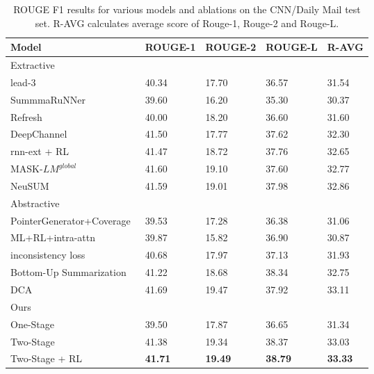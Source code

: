 \documentclass{article}
\begin{document}
\begin{table*}[tpb]  
\centering
\begin{tabular}{l|lll|l}
\hline
Model                 & ROUGE-1                     & ROUGE-2       &      ROUGE-L    &  R-AVG     \\ \hline
Extractive \\ \hline
lead-3~\cite{See2017}   & 40.34    &  17.70   &      36.57     &   31.54        \\
SummmaRuNNer~\cite{NallapatiZZ17}     & 39.60     &  16.20         &      35.30     &   30.37         \\ 
Refresh~\cite{Narayan2018}               & 40.00                       &  18.20         &      36.60     & 31.60            \\ 
DeepChannel~\cite{Shi2018}  & 41.50                       &  17.77         &      37.62   & 32.30        \\
rnn-ext + RL~\cite{chen2018fast}          & 41.47                       &  18.72         &      37.76   & 32.65            \\
MASK-$LM^{global}$~\cite{Chang2019}   & 41.60 & 19.10 & 37.60 & 32.77 \\
NeuSUM~\cite{DBLP:conf/acl/ZhaoZWYHZ18}              & 41.59                       &  19.01         &      37.98     & 32.86          \\
\hline
Abstractive \\ \hline
PointerGenerator+Coverage~\cite{See2017}      & 39.53                       & 17.28         &      36.38      & 31.06           \\
ML+RL+intra-attn~\cite{Paulus2018} & 39.87                  &  15.82        &      36.90      & 30.87           \\ 
inconsistency loss\cite{hsu2018unified}    & 40.68                       &  17.97        &      37.13      & 31.93      \\
Bottom-Up Summarization~\cite{gehrmann2018bottom} & 41.22                     &  18.68        &      38.34      & 32.75      \\
DCA~\cite{Celikyilmaz2018}                   & 41.69                       &  19.47        &      37.92      & 33.11         \\ \hline
Ours \\ \hline
One-Stage           &39.50        & 17.87          & 36.65  & 31.34  \\   
Two-Stage         & 41.38  & 19.34 & 38.37       & 33.03 \\
Two-Stage + RL               & \textbf{41.71} & \textbf{19.49} & \textbf{38.79}               & \textbf{33.33}                      \\ \hline
\end{tabular}
\caption{ROUGE F1 results for various models and ablations on the CNN/Daily Mail test set. R-AVG calculates average score of Rouge-1, Rouge-2 and Rouge-L.\label{r1}}
\end{table*}
\end{document}
